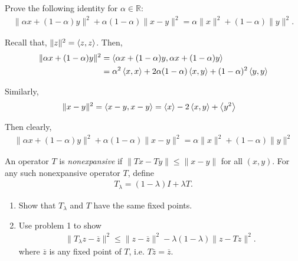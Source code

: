\documentclass[10pt]{article}
\begin{document}
\maketitle

\begin{problem}[Problem 1]
Prove the following identity for \( \alpha \in \mathbb{R} \):
\begin{align*}
    \|\alpha x + (1-\alpha) y\|^2 + \alpha(1-\alpha) \|x-y\|^2 = \alpha \|x\|^2 + (1-\alpha) \|y\|^2.
\end{align*}
\end{problem}

\begin{solution}[Solution]
Recall that, \( \| z \|^2 = \left\langle z,z \right\rangle \). Then,
\begin{align*}
    \| \alpha x + (1-\alpha) y \|^2 &= \left\langle \alpha x + (1-\alpha) y,\alpha x + (1-\alpha) y \right\rangle
    \\&= \alpha^2 \left\langle x,x \right\rangle + 2 \alpha(1-\alpha)\left\langle x,y \right\rangle + (1-\alpha)^2 \left\langle y,y \right\rangle
\end{align*}

Similarly,
\begin{align*}
    \| x - y \|^2 &= \left\langle x-y,x-y \right\rangle
    = \left\langle x \right\rangle - 2\left\langle x,y \right\rangle + \left\langle y^2 \right\rangle
\end{align*}

Then clearly,
\begin{align*}
    \|\alpha x + (1-\alpha) y\|^2 + \alpha(1-\alpha) \|x-y\|^2 = \alpha \|x\|^2 + (1-\alpha) \|y\|^2 \tag*{\qed}
\end{align*}


\end{solution}

\begin{problem}[Problem 2]
An operator \( T \) is {\it nonexpansive} if  \( \|Tx - Ty\| \leq \|x - y\| \) for all \( (x,y) \). 
For any such nonexpansive operator \( T \), define 
\begin{align*}
    T_\lambda = (1-\lambda)I + \lambda T. 
\end{align*}
\begin{enumerate}[nolistsep,label=(\alph*)]
\item Show that \( T_\lambda \) and \( T \) have the same fixed points. 
\item Use problem 1 to show 
\begin{align*}
    \|T_\lambda z - \overline z\|^2 \leq \|z-\overline z\|^2 - \lambda(1-\lambda) \|z - Tz\|^2.
\end{align*}
where \( \overline z \) is any fixed point of \( T \), i.e. \( T\overline z = \overline z \).
\end{enumerate}
\end{problem}
\end{document}
